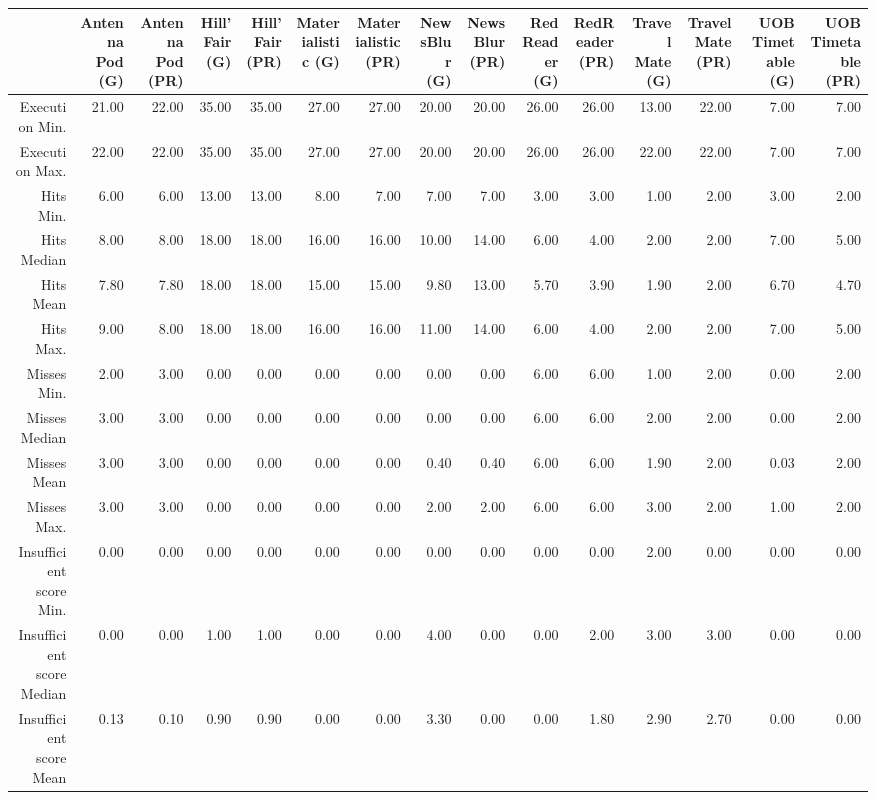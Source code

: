 \begin{table}[ht]
\centering
\begin{tabular}{rrrrrrrrrrrrrrr}
  \hline
 & Antenna Pod (G) & Antenna Pod (PR) & Hill'Fair (G) & Hill'Fair (PR) & Materialistic (G) & Materialistic (PR) & NewsBlur (G) & NewsBlur (PR) & RedReader (G) & RedReader (PR) & Travel Mate (G) & Travel Mate (PR) & UOB Timetable (G) & UOB Timetable (PR) \\ 
  \hline
Execution Min. & 21.00 & 22.00 & 35.00 & 35.00 & 27.00 & 27.00 & 20.00 & 20.00 & 26.00 & 26.00 & 13.00 & 22.00 & 7.00 & 7.00 \\ 
  Execution Max. & 22.00 & 22.00 & 35.00 & 35.00 & 27.00 & 27.00 & 20.00 & 20.00 & 26.00 & 26.00 & 22.00 & 22.00 & 7.00 & 7.00 \\ 
  Hits Min. & 6.00 & 6.00 & 13.00 & 13.00 & 8.00 & 7.00 & 7.00 & 7.00 & 3.00 & 3.00 & 1.00 & 2.00 & 3.00 & 2.00 \\ 
  Hits Median & 8.00 & 8.00 & 18.00 & 18.00 & 16.00 & 16.00 & 10.00 & 14.00 & 6.00 & 4.00 & 2.00 & 2.00 & 7.00 & 5.00 \\ 
  Hits Mean & 7.80 & 7.80 & 18.00 & 18.00 & 15.00 & 15.00 & 9.80 & 13.00 & 5.70 & 3.90 & 1.90 & 2.00 & 6.70 & 4.70 \\ 
  Hits Max. & 9.00 & 8.00 & 18.00 & 18.00 & 16.00 & 16.00 & 11.00 & 14.00 & 6.00 & 4.00 & 2.00 & 2.00 & 7.00 & 5.00 \\ 
  Misses Min. & 2.00 & 3.00 & 0.00 & 0.00 & 0.00 & 0.00 & 0.00 & 0.00 & 6.00 & 6.00 & 1.00 & 2.00 & 0.00 & 2.00 \\ 
  Misses Median & 3.00 & 3.00 & 0.00 & 0.00 & 0.00 & 0.00 & 0.00 & 0.00 & 6.00 & 6.00 & 2.00 & 2.00 & 0.00 & 2.00 \\ 
  Misses Mean & 3.00 & 3.00 & 0.00 & 0.00 & 0.00 & 0.00 & 0.40 & 0.40 & 6.00 & 6.00 & 1.90 & 2.00 & 0.03 & 2.00 \\ 
  Misses Max. & 3.00 & 3.00 & 0.00 & 0.00 & 0.00 & 0.00 & 2.00 & 2.00 & 6.00 & 6.00 & 3.00 & 2.00 & 1.00 & 2.00 \\ 
  Insufficient score Min. & 0.00 & 0.00 & 0.00 & 0.00 & 0.00 & 0.00 & 0.00 & 0.00 & 0.00 & 0.00 & 2.00 & 0.00 & 0.00 & 0.00 \\ 
  Insufficient score Median & 0.00 & 0.00 & 1.00 & 1.00 & 0.00 & 0.00 & 4.00 & 0.00 & 0.00 & 2.00 & 3.00 & 3.00 & 0.00 & 0.00 \\ 
  Insufficient score Mean & 0.13 & 0.10 & 0.90 & 0.90 & 0.00 & 0.00 & 3.30 & 0.00 & 0.00 & 1.80 & 2.90 & 2.70 & 0.00 & 0.00 \\ 

\end{tabular}
\end{table}
